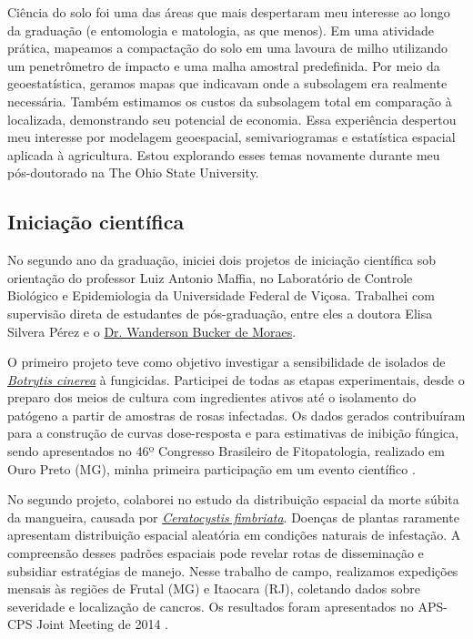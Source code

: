 \documentclass[12pt,a4paper,oneside]{book}
\newcommand{\UFV}{Universidade Federal de Viçosa}
\newcommand{\OSU}{The Ohio State University}
\begin{document}
Ciência do solo foi uma das áreas que mais despertaram meu interesse ao longo da graduação (e entomologia e matologia, 
as que menos). Em uma atividade prática, mapeamos a compactação do solo em uma lavoura de milho utilizando 
um penetrômetro de impacto e uma malha amostral predefinida. Por meio da geoestatística, geramos mapas que 
indicavam onde a subsolagem era realmente necessária. Também estimamos os 
custos da subsolagem total em comparação à localizada, demonstrando seu potencial de economia. Essa 
experiência despertou meu interesse por modelagem geoespacial, semivariogramas e estatística espacial 
aplicada à agricultura. Estou explorando esses temas novamente durante meu 
pós-doutorado na \OSU{}.

\subsection{Iniciação científica}

No segundo ano da graduação, iniciei dois projetos de iniciação científica sob orientação do professor 
Luiz Antonio Maffia, no Laboratório de Controle Biológico e Epidemiologia da \UFV{}. Trabalhei com 
supervisão direta de estudantes de pós-graduação, entre eles a doutora Elisa Silvera Pérez e 
o \href{https://www.linkedin.com/in/wanderson-bucker-moraes-31b06434/}{Dr. Wanderson Bucker de Moraes}.

O primeiro projeto teve como objetivo investigar a sensibilidade de isolados de 
\href{https://en.wikipedia.org/wiki/Botrytis_cinerea}{\textit{Botrytis cinerea}} à 
fungicidas. Participei de todas as etapas experimentais, desde o preparo dos meios de cultura 
com ingredientes ativos até o isolamento do patógeno a partir de amostras de rosas infectadas. 
Os dados gerados contribuíram para a construção de curvas dose-resposta e para estimativas de 
inibição fúngica, sendo apresentados no 46º Congresso Brasileiro de Fitopatologia, realizado 
em Ouro Preto (MG), minha primeira participação em um evento científico \citep{Garnica2013}.

No segundo projeto, colaborei no estudo da distribuição espacial da morte súbita da mangueira, 
causada por \href{https://en.wikipedia.org/wiki/Ceratocystis_fimbriata}{\textit{Ceratocystis fimbriata}}. 
Doenças de plantas raramente apresentam distribuição espacial aleatória em condições naturais de 
infestação. A compreensão desses padrões espaciais pode revelar rotas de disseminação e subsidiar 
estratégias de manejo. Nesse trabalho de campo, realizamos expedições mensais às regiões de 
Frutal (MG) e Itaocara (RJ), coletando dados sobre severidade e localização de cancros. Os 
resultados foram apresentados no APS-CPS Joint Meeting de 2014 \citep{Bucker2014a,Bucker2014b,Bucker2014c}.
\end{document}

